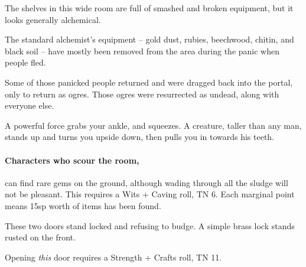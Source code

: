 \begin{multicols}{2}


\begin{boxtext}

  The shelves in this wide room are full of smashed and broken equipment, but it looks generally alchemical.

\end{boxtext}

\begin{exampletext}

The standard alchemist's equipment -- gold dust, rubies, beechwood, chitin, and black soil -- have mostly been removed from the area during the panic when people fled.

Some of those panicked people returned and were dragged back into the portal, only to return as ogres.  Those ogres were resurrected as undead, along with everyone else.

\end{exampletext}

\begin{boxtext}

  A powerful force grabs your ankle, and squeezes.
  A creature, taller than any man, stands up and turns you upside down, then pulls you in towards his teeth.

\end{boxtext}



\paragraph{Characters who scour the room,}
can find rare gems on the ground, although wading through all the sludge will not be pleasant.
This requires a Wits + Caving roll, TN 6.
Each marginal point means 15sp worth of items has been found.


\begin{boxtext}

  These two doors stand locked and refusing to budge.  A simple brass lock stands rusted on the front.

\end{boxtext}

Opening \emph{this} door requires a Strength + Crafts roll, TN 11.


\end{multicols}
